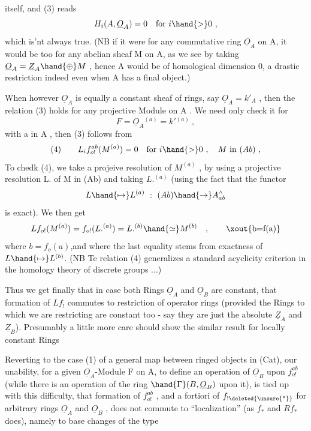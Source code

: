 itself,  and (3) reads
\[ H_i(A,\underline{O}_A)= 0 \quad \text{for } i\hand{>}0 \ , \]
which is'nt always true.  (NB if it were for any commutative ring $\underline{O}_A$
on A,  it would be too for any abelian sheaf M on A,  as we see by 
taking  $\underline{O}_A = \underline{Z}_A \hand{\oplus} M$ ,  hence A would be of  homological dimension 0,
a drastic restriction indeed  even when A has a final object.)

When however $\underline{O}_A$ is equally a constant sheaf of rings,  
say  $\underline{O}_A = k'_A$ ,  then the relation (3) holds for any projective Module
on A .  We need only check it for
\[ F = \underline{O}_A{}^{(a)} = k'{}^{(a)} \ , \]
with a in A ,  then (3) follows from
\[ \text{(4)} \qquad L_i f^{ab}_{o!}(M^{(a)}) = 0 \quad \text{for } i\hand{>}0 \ , \quad M \text{ in } (Ab) \ , \]
To chedk (4),  we take a projeive resolution of $M^{(a)}$ ,  by using a
projective resolution L. of M in (Ab) and taking  $L.^{(a)}$  (using the
fact that the functor
\[ L \hand{\mapsto} L^{(a)} \ : \ (Ab) \hand{\to} A^{\wedge}_{ab} \]
is exact).  We then get
\[ Lf_{o!}(M^{(a)}) = f_{o!}(L.^{(a)}) = L.^{(b)} \hand{\simeq} M^{(b)} \quad , \qquad \text{\xout{b=f(a)}} \]
where $b=f_o(a)$,and where the last equality stems from exactness of $L\hand{\mapsto} L^{(b)}$.
(NB  Te relation (4) generalizes a standard acyclicity criterion in
the homology theory of discrete groups ...)

Thus we get finally that in case both Rings $\underline{O}_A$ and $\underline{O}_B$ are constant,
that formation of $Lf_!$  commutes to restriction of operator rings
(provided the Rings to which we are restricting are constant too  -
say they are just the absolute $\underline{Z}_A$ and $\underline{Z}_B$).  Presumably a little more
care should show the similar result for locally constant Rings 

Reverting to the case (1) of a general map between ringed objects
in (Cat),  our unability,  for a given $\underline{O}_A$-Module F on A,  to define an
operation of $\underline{O}_B$ upon $f^{ab}_{o!}$  (while there is an operation of the ring
$\hand{\Gamma}(B,\underline{O}_B)$ upon it),  is tied up with this difficulty,  that formation
of  $f^{ab}_{o!}$ ,  and a fortiori of $f_{!\text{\deleted{\unsure{*}}}}$ for arbitrary rings $\underline{O}_A$ and $\underline{O}_B$ , does
not commute to ``localization'' (as $f_*$ and $Rf_*$ does),  namely to base
changes of the type


